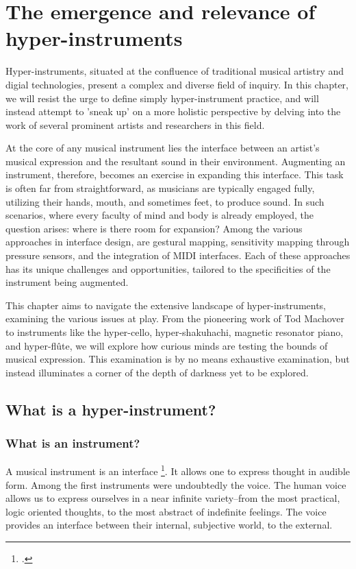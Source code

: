 \documentclass[12pt,twoside,maitrise]{dms_ks}
\theoremstyle{definition}
\begin{document}
\chapter{The emergence and relevance of hyper-instruments}

Hyper-instruments, situated at the confluence of traditional musical artistry and digial technologies, present a complex and diverse field of inquiry.
In this chapter, we will resist the urge to define simply hyper-instrument practice, and will instead attempt to 'sneak up' on a more holistic perspective by delving into the work of several prominent artists and researchers in this field.

At the core of any musical instrument lies the interface between an artist's musical expression and the resultant sound in their environment.
Augmenting an instrument, therefore, becomes an exercise in expanding this interface.
This task is often far from straightforward, as musicians are typically engaged fully, utilizing their hands, mouth, and sometimes feet, to produce sound.
In such scenarios, where every faculty of mind and body is already employed, the question arises: where is there room for expansion?
Among the various approaches in interface design, are gestural mapping, sensitivity mapping through pressure sensors, and the integration of MIDI interfaces.
Each of these approaches has its unique challenges and opportunities, tailored to the specificities of the instrument being augmented.

This chapter aims to navigate the extensive landscape of hyper-instruments, examining the various issues at play.
From the pioneering work of Tod Machover to instruments like the hyper-cello, hyper-shakuhachi, magnetic resonator piano, and hyper-flûte, we will explore how curious minds are testing the bounds of musical expression.
This examination is by no means exhaustive examination, but instead illuminates a corner of the depth of darkness yet to be explored. 

\section{What is a hyper-instrument?}

\subsection{What is an instrument?}

A musical instrument is an interface \footcite{noauthor_instrument_nodate}. 
It allows one to express thought in audible form. 
Among the first instruments were undoubtedly the voice. 
The human voice allows us to express ourselves in a near infinite variety--from the most practical, logic oriented thoughts, to the most abstract of indefinite feelings. 
The voice provides an interface between their internal, subjective world, to the external. 
\end{document}
